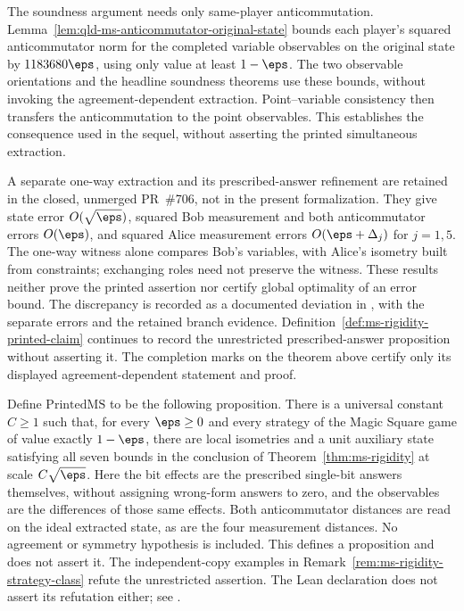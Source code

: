 \begin{remark}
  The soundness argument needs only same-player anticommutation.
  Lemma~\ref{lem:qld-ms-anticommutator-original-state} bounds each player's
  squared anticommutator norm for the completed variable observables on the
  original state by $1183680\eps$, using only value at least $1-\eps$.
  The two observable orientations and the headline soundness theorems use
  these bounds, without invoking the agreement-dependent extraction.
  Point--variable consistency then transfers the anticommutation to the
  point observables. This establishes the consequence used in the sequel,
  without asserting the printed simultaneous extraction.

  A separate one-way extraction and its prescribed-answer refinement are
  retained in the closed, unmerged PR~\#706, not in the present formalization.
  They give state error $O(\sqrt\eps)$, squared Bob measurement and both
  anticommutator errors $O(\eps)$, and squared Alice measurement errors
  $O(\eps+\Delta_j)$ for $j=1,5$. The one-way witness alone compares Bob's
  variables, with Alice's isometry built from constraints; exchanging roles
  need not preserve the witness. These results neither prove the printed
  assertion nor certify global optimality of an error bound.
  The discrepancy is recorded as a documented deviation in
  \cite{gap:qpbt_ms-rigidity-symmetric-strategies}, with the separate errors
  and the retained branch evidence. Definition~\ref{def:ms-rigidity-printed-claim}
  continues to record the unrestricted prescribed-answer proposition without
  asserting it. The completion marks on the theorem above certify only its
  displayed agreement-dependent statement and proof.
\end{remark}

\begin{definition}
  \label{def:ms-rigidity-printed-claim}
  \leanok
  Define $\mathrm{PrintedMS}$ to be the following proposition. There is a
  universal constant $C\geq1$ such that, for every $\eps\geq0$ and every
  strategy of the Magic Square game of value exactly $1-\eps$, there are
  local isometries and a unit auxiliary state satisfying all seven bounds
  in the conclusion of Theorem~\ref{thm:ms-rigidity} at scale $C\sqrt\eps$.
  Here the bit effects are the prescribed single-bit answers themselves,
  without assigning wrong-form answers to zero, and the observables are
  the differences of those same effects. Both anticommutator distances
  are read on the ideal extracted state, as are the four measurement
  distances. No agreement or symmetry hypothesis is included.
  This defines a proposition and does not assert it. The independent-copy
  examples in Remark~\ref{rem:ms-rigidity-strategy-class} refute the
  unrestricted assertion. The Lean declaration does not assert its
  refutation either; see \cite{gap:qpbt_ms-rigidity-symmetric-strategies}.
\end{definition}

